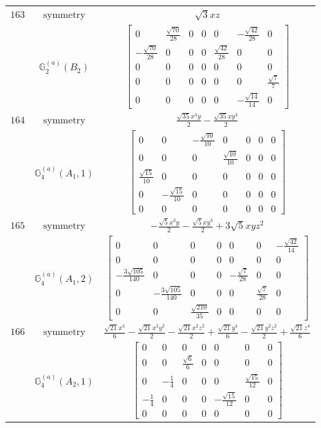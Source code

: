 \documentclass[fleqn,8pt,landscape]{jsarticle}
\begin{document}
\begin{longtable}{ccc}
$ 163 $ & $ \text{symmetry} $ & $ \sqrt{3} x z $ \\
$  $ & $ \mathbb{G}_{2}^{(a)}(B_{2}) $ & $ \begin{bmatrix} 0 & \frac{\sqrt{70}}{28} & 0 & 0 & 0 & - \frac{\sqrt{42}}{28} & 0 \\ - \frac{\sqrt{70}}{28} & 0 & 0 & 0 & \frac{\sqrt{42}}{28} & 0 & 0 \\ 0 & 0 & 0 & 0 & 0 & 0 & 0 \\ 0 & 0 & 0 & 0 & 0 & 0 & \frac{\sqrt{7}}{7} \\ 0 & 0 & 0 & 0 & 0 & - \frac{\sqrt{14}}{14} & 0 \end{bmatrix} $ \\ \hline
$ 164 $ & $ \text{symmetry} $ & $ \frac{\sqrt{35} x^{3} y}{2} - \frac{\sqrt{35} x y^{3}}{2} $ \\
$  $ & $ \mathbb{G}_{4}^{(a)}(A_{1},1) $ & $ \begin{bmatrix} 0 & 0 & - \frac{\sqrt{10}}{10} & 0 & 0 & 0 & 0 \\ 0 & 0 & 0 & \frac{\sqrt{10}}{10} & 0 & 0 & 0 \\ \frac{\sqrt{15}}{10} & 0 & 0 & 0 & 0 & 0 & 0 \\ 0 & - \frac{\sqrt{15}}{10} & 0 & 0 & 0 & 0 & 0 \\ 0 & 0 & 0 & 0 & 0 & 0 & 0 \end{bmatrix} $ \\ \hline
$ 165 $ & $ \text{symmetry} $ & $ - \frac{\sqrt{5} x^{3} y}{2} - \frac{\sqrt{5} x y^{3}}{2} + 3 \sqrt{5} x y z^{2} $ \\
$  $ & $ \mathbb{G}_{4}^{(a)}(A_{1},2) $ & $ \begin{bmatrix} 0 & 0 & 0 & 0 & 0 & 0 & - \frac{\sqrt{42}}{14} \\ 0 & 0 & 0 & 0 & 0 & 0 & 0 \\ - \frac{3 \sqrt{105}}{140} & 0 & 0 & 0 & - \frac{\sqrt{7}}{28} & 0 & 0 \\ 0 & - \frac{3 \sqrt{105}}{140} & 0 & 0 & 0 & \frac{\sqrt{7}}{28} & 0 \\ 0 & 0 & \frac{\sqrt{210}}{35} & 0 & 0 & 0 & 0 \end{bmatrix} $ \\ \hline
$ 166 $ & $ \text{symmetry} $ & $ \frac{\sqrt{21} x^{4}}{6} - \frac{\sqrt{21} x^{2} y^{2}}{2} - \frac{\sqrt{21} x^{2} z^{2}}{2} + \frac{\sqrt{21} y^{4}}{6} - \frac{\sqrt{21} y^{2} z^{2}}{2} + \frac{\sqrt{21} z^{4}}{6} $ \\
$  $ & $ \mathbb{G}_{4}^{(a)}(A_{2},1) $ & $ \begin{bmatrix} 0 & 0 & 0 & 0 & 0 & 0 & 0 \\ 0 & 0 & \frac{\sqrt{6}}{6} & 0 & 0 & 0 & 0 \\ 0 & - \frac{1}{4} & 0 & 0 & 0 & \frac{\sqrt{15}}{12} & 0 \\ - \frac{1}{4} & 0 & 0 & 0 & - \frac{\sqrt{15}}{12} & 0 & 0 \\ 0 & 0 & 0 & 0 & 0 & 0 & 0 \end{bmatrix} $ \\ \hline

\end{longtable}
\end{document}
